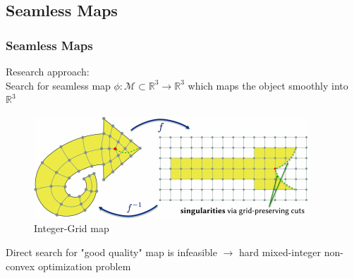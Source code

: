 \documentclass[
	11pt, %
	aspectratio=169, %
]{beamer}
\begin{document}

\subsection{Seamless Maps}
\begin{frame}
	\frametitle{Seamless Maps}
	Research approach: \\
	Search for seamless map $\phi : \mathcal{M} \subset \mathbb{R}^3 \to \mathbb{R}^3$
	which maps the object smoothly into $\mathbb{R}^3$

	\begin{figure}
		\includegraphics[width=0.5\linewidth]{integer-grid-rough.png}
		\caption{Integer-Grid map \cite{survey}}
	\end{figure}
	Direct search for "good quality" map is infeasible $\rightarrow$ hard mixed-integer non-convex optimization problem
\end{frame}
	
	
	
	
\end{document}
